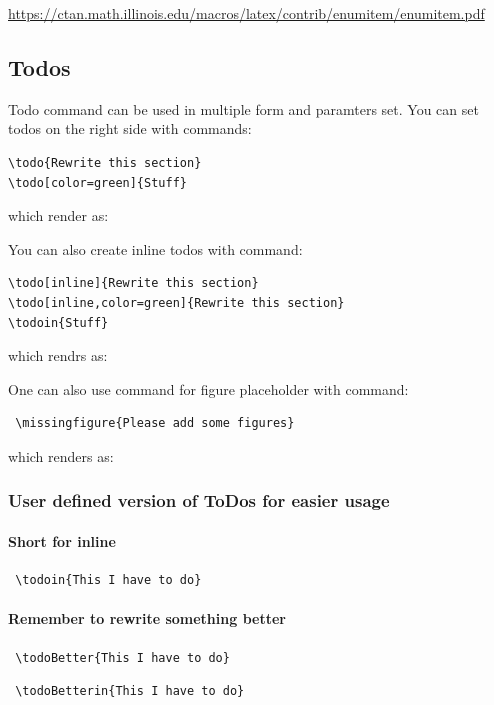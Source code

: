 \url{https://ctan.math.illinois.edu/macros/latex/contrib/enumitem/enumitem.pdf}

\subsection{Todos}

Todo command can be used in multiple form and paramters set. You can set todos on the right side with commands:
{\small
\begin{verbatim}
\todo{Rewrite this section}
\todo[color=green]{Stuff}
\end{verbatim}
} which render as:




You can also create inline todos with command:
{\small
\begin{verbatim}
\todo[inline]{Rewrite this section}
\todo[inline,color=green]{Rewrite this section}
\todoin{Stuff}
\end{verbatim}
} which rendrs as:

One can also use command for figure placeholder with command:
{\small
\begin{verbatim}
 \missingfigure{Please add some figures}
\end{verbatim}
} which renders as:


\subsubsection{User defined version of ToDos for easier usage}

\paragraph{Short for inline}
\begin{verbatim}
 \todoin{This I have to do}
\end{verbatim}

\paragraph{Remember to rewrite something better}
\begin{verbatim}
 \todoBetter{This I have to do}
\end{verbatim}
\begin{verbatim}
 \todoBetterin{This I have to do}
\end{verbatim}

